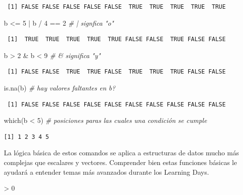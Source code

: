\documentclass[
  12pt,
  spanish,
]{book}
\newenvironment{Shaded}{\begin{snugshade}}{\end{snugshade}}
\newcommand{\CommentTok}[1]{\textcolor[rgb]{0.56,0.35,0.01}{\textit{#1}}}
\newcommand{\DecValTok}[1]{\textcolor[rgb]{0.00,0.00,0.81}{#1}}
\newcommand{\FunctionTok}[1]{\textcolor[rgb]{0.00,0.00,0.00}{#1}}
\newcommand{\NormalTok}[1]{#1}
\newcommand{\SpecialCharTok}[1]{\textcolor[rgb]{0.00,0.00,0.00}{#1}}
\newlength{\cslhangindent}
\newenvironment{CSLReferences}[2] %
 {%
  \setlength{\parindent}{0pt}
  \ifodd #1 \everypar{\setlength{\hangindent}{\cslhangindent}}\ignorespaces\fi
  \ifnum #2 > 0
  \setlength{\parskip}{#2\baselineskip}
  \fi
 }%
 {}
\begin{document}
\begin{verbatim}
 [1] FALSE FALSE FALSE FALSE FALSE  TRUE  TRUE  TRUE  TRUE  TRUE
\end{verbatim}

\begin{Shaded}
\begin{Highlighting}[]
\NormalTok{b }\SpecialCharTok{\textless{}=} \DecValTok{5} \SpecialCharTok{|}\NormalTok{ b }\SpecialCharTok{/} \DecValTok{4} \SpecialCharTok{==} \DecValTok{2} \CommentTok{\# | signfica "o"}
\end{Highlighting}
\end{Shaded}

\begin{verbatim}
 [1]  TRUE  TRUE  TRUE  TRUE  TRUE FALSE FALSE  TRUE FALSE FALSE
\end{verbatim}

\begin{Shaded}
\begin{Highlighting}[]
\NormalTok{b }\SpecialCharTok{\textgreater{}} \DecValTok{2} \SpecialCharTok{\&}\NormalTok{ b }\SpecialCharTok{\textless{}} \DecValTok{9} \CommentTok{\# \& significa "y"}
\end{Highlighting}
\end{Shaded}

\begin{verbatim}
 [1] FALSE FALSE  TRUE  TRUE FALSE  TRUE  TRUE  TRUE FALSE FALSE
\end{verbatim}

\begin{Shaded}
\begin{Highlighting}[]
\FunctionTok{is.na}\NormalTok{(b) }\CommentTok{\# hay valores faltantes en b?}
\end{Highlighting}
\end{Shaded}

\begin{verbatim}
 [1] FALSE FALSE FALSE FALSE FALSE FALSE FALSE FALSE FALSE FALSE
\end{verbatim}

\begin{Shaded}
\begin{Highlighting}[]
\FunctionTok{which}\NormalTok{(b }\SpecialCharTok{\textless{}} \DecValTok{5}\NormalTok{) }\CommentTok{\# posiciones paras las cuales una condición se cumple}
\end{Highlighting}
\end{Shaded}

\begin{verbatim}
[1] 1 2 3 4 5
\end{verbatim}

La lógica básica de estos comandos se aplica a estructuras de datos mucho más complejas que escalares y vectores. Comprender bien estas funciones básicas le ayudará a entender temas más avanzados durante los Learning Days.

\hypertarget{refs}{}
\begin{CSLReferences}{0}{0}
\end{CSLReferences}

\printbibliography
\end{document}
